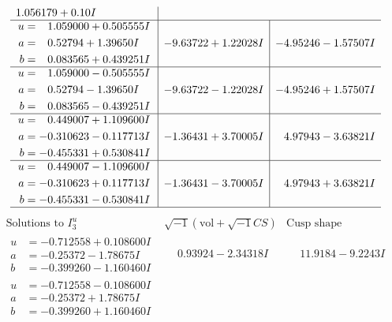 \documentclass[1p]{elsarticle_modified}
\theoremstyle{definition}
\newcommand{\I}{\sqrt{-1}}
\begin{document}
$$\begin{array}{c|c|c}
1.056179 + 0. 10   I\phantom{ +0.000000I} \\ \hline\begin{aligned}
u &= \phantom{-}1.059000 + 0.505555 I \\
a &= \phantom{-}0.52794 + 1.39650 I \\
b &= \phantom{-}0.083565 + 0.439251 I\end{aligned}
 & -9.63722 + 1.22028 I & -4.95246 - 1.57507 I \\ \hline\begin{aligned}
u &= \phantom{-}1.059000 - 0.505555 I \\
a &= \phantom{-}0.52794 - 1.39650 I \\
b &= \phantom{-}0.083565 - 0.439251 I\end{aligned}
 & -9.63722 - 1.22028 I & -4.95246 + 1.57507 I \\ \hline\begin{aligned}
u &= \phantom{-}0.449007 + 1.109600 I \\
a &= -0.310623 - 0.117713 I \\
b &= -0.455331 + 0.530841 I\end{aligned}
 & -1.36431 + 3.70005 I & \phantom{-}4.97943 - 3.63821 I \\ \hline\begin{aligned}
u &= \phantom{-}0.449007 - 1.109600 I \\
a &= -0.310623 + 0.117713 I \\
b &= -0.455331 - 0.530841 I\end{aligned}
 & -1.36431 - 3.70005 I & \phantom{-}4.97943 + 3.63821 I\\
 \hline 
 \end{array}$$\newpage$$\begin{array}{c|c|c}  
\text{Solutions to }I^u_{3}& \I (\text{vol} + \sqrt{-1}CS) & \text{Cusp shape}\\
 \hline 
\begin{aligned}
u &= -0.712558 + 0.108600 I \\
a &= -0.25372 - 1.78675 I \\
b &= -0.399260 - 1.160460 I\end{aligned}
 & \phantom{-}0.93924 - 2.34318 I & \phantom{-}11.9184 - 9.2243 I \\ \hline\begin{aligned}
u &= -0.712558 - 0.108600 I \\
a &= -0.25372 + 1.78675 I \\
b &= -0.399260 + 1.160460 I\end{aligned}

\end{array}$$
\end{document}
